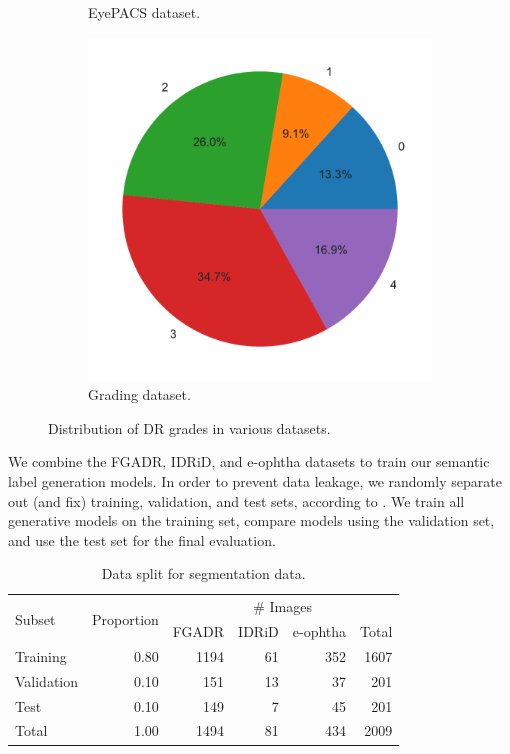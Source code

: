 \begin{figure}[h]
\begin{subfigure}{0.3\textwidth}
        \caption{EyePACS dataset.}
        \label{fig:eyepacs_grade_dist}
    \end{subfigure}
    \begin{subfigure}{0.3\textwidth}
        \centering
        \includegraphics[width=\textwidth]{datasets/figs/grading_grade_dist.pdf}
        \caption{Grading dataset.}
        \label{fig:grading_grade_dist}
    \end{subfigure}
    \caption{Distribution of DR grades in various datasets.}
    \label{fig:combined_grade_dist}
\end{figure}

We combine the FGADR, IDRiD, and e-ophtha datasets to train our semantic label generation models.
In order to prevent data leakage, we randomly separate out (and fix) training, validation, and test sets, according to .
We train all generative models on the training set, compare models using the validation set, and use the test set for the final evaluation.

\begin{table}[h]
    \centering
    \begin{tabular}{lrrrrr}
        \toprule
        \multirow{2}{*}{Subset} & \multirow{2}{*}{Proportion} & \multicolumn{4}{c}{\# Images} \\
        \cmidrule{3-6}
         & & FGADR & IDRiD & e-ophtha & Total \\
        \midrule
        Training & 0.80 & 1194 & 61 & 352 & 1607 \\
        Validation & 0.10 & 151 & 13 & 37 & 201 \\
        Test & 0.10 & 149 & 7 & 45 & 201 \\
        \midrule
        Total & 1.00 & 1494 & 81 & 434 & 2009 \\
        \bottomrule
    \end{tabular}
    \caption{Data split for segmentation data.}
    \label{tab:label_split}
\end{table}

